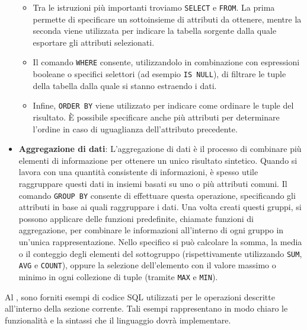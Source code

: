 \documentclass[12pt,a4paper,openright,twoside]{book}
\begin{document}
\begin{itemize}
    \begin{itemize}
        \item Tra le istruzioni più importanti troviamo \texttt{SELECT} e \texttt{FROM}. La prima permette di specificare un sottoinsieme 
        di attributi da ottenere, mentre la seconda viene utilizzata per indicare la tabella sorgente dalla quale esportare gli attributi 
        selezionati.
        \item Il comando \texttt{WHERE} consente, utilizzandolo in combinazione con espressioni booleane o specifici selettori (ad esempio 
        \texttt{IS NULL}), di filtrare le tuple della tabella dalla quale si stanno estraendo i dati.
        \item Infine, \texttt{ORDER BY} viene utilizzato per indicare come ordinare le tuple del risultato. È possibile specificare anche 
        più attributi per determinare l’ordine in caso di uguaglianza dell’attributo precedente.
    \end{itemize}

    \item \textbf{Aggregazione di dati}: L’aggregazione di dati è il processo di combinare più elementi di informazione per ottenere un unico 
    risultato sintetico. Quando si lavora con una quantità consistente di informazioni, è spesso utile raggruppare questi dati in insiemi 
    basati su uno o più attributi comuni. Il comando \texttt{GROUP BY} consente di effettuare questa operazione, specificando gli attributi
    in base ai quali raggruppare i dati. Una volta creati questi gruppi, si possono applicare delle funzioni predefinite, chiamate funzioni
    di aggregazione, per combinare le informazioni all’interno di ogni gruppo in un’unica rappresentazione. Nello specifico si può calcolare 
    la somma, la media o il conteggio degli elementi del sottogruppo (rispettivamente utilizzando \texttt{SUM}, \texttt{AVG} e \texttt{COUNT}), 
    oppure la selezione dell’elemento con il valore massimo o minimo in ogni collezione di tuple (tramite \texttt{MAX} e \texttt{MIN}).
\end{itemize}

Al , sono forniti esempi di codice SQL utilizzati per le operazioni descritte all'interno della sezione corrente. Tali esempi 
rappresentano in modo chiaro le funzionalità e la sintassi che il linguaggio dovrà implementare.


\end{document}
